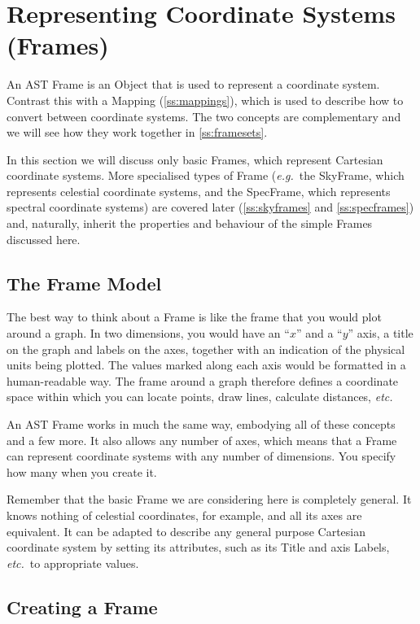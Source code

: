 \documentclass[twoside,11pt]{article}
\newcommand{\secref}[1]{\S\ref{#1}}
\renewcommand{\secref}[1]{\ref{#1}}
\begin{document}
\cleardoublepage
\section{\label{ss:frames}Representing Coordinate Systems (Frames)}

An AST Frame is an Object that is used to represent a coordinate
system. Contrast this with a Mapping (\secref{ss:mappings}), which is
used to describe how to convert between coordinate systems. The two
concepts are complementary and we will see how they work together in
\secref{ss:framesets}.

In this section we will discuss only basic Frames, which represent
Cartesian coordinate systems. More specialised types of Frame
({\em{e.g.}}\ the SkyFrame, which represents celestial coordinate
systems, and the SpecFrame, which represents spectral coordinate
systems) are covered later (\secref{ss:skyframes} and \secref{ss:specframes}) 
and, naturally, inherit the properties and behaviour of the simple Frames 
discussed here.

\subsection{The Frame Model}

The best way to think about a Frame is like the frame that you would
plot around a graph. In two dimensions, you would have an ``$x$'' and
a ``$y$'' axis, a title on the graph and labels on the axes, together
with an indication of the physical units being plotted. The values
marked along each axis would be formatted in a human-readable way. The
frame around a graph therefore defines a coordinate space within which
you can locate points, draw lines, calculate distances, {\em{etc.}}

An AST Frame works in much the same way, embodying all of these
concepts and a few more. It also allows any number of axes, which
means that a Frame can represent coordinate systems with any number of
dimensions. You specify how many when you create it.

Remember that the basic Frame we are considering here is completely
general.  It knows nothing of celestial coordinates, for example, and
all its axes are equivalent. It can be adapted to describe any general
purpose Cartesian coordinate system by setting its attributes, such as
its Title and axis Labels, {\em{etc.}}\ to appropriate values.

\subsection{\label{ss:creatingframes}Creating a Frame}
\end{document}
